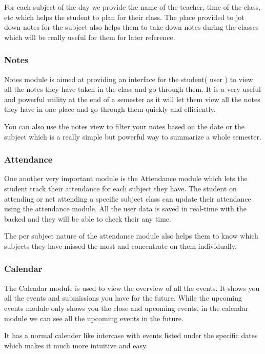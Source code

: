 \documentclass{article}
\begin{document}
For each subject of the day we provide the name of the teacher, time of the class, etc which helps the student to plan for their class.
The place provided to jot down notes for the subject also helps them to take down notes during the classes which will be really useful for them for later reference.

\subsubsection{Notes}
Notes module is aimed at providing an interface for the student( user ) to view all the notes they have taken in the class and go through them.
It is a very useful and powerful utility at the end of a semester as it will let them view all the notes they have in one place and go through them quickly and efficiently.

You can also use the notes view to filter your notes based on the date or the subject which is a really simple but powerful way to summarize a whole semester.

\subsubsection{Attendance}
One another very important module is the Attendance module which lets the student track their attendance for each subject they have. The student on attending or net attending a specific subject class can update their attendance using the attendance module. All the user data is saved in real-time with the backed and they will be able to check their any time.

The per subject nature of the attendance module also helps them to know which subjects they have missed the most and concentrate on them individually.

\subsubsection{Calendar}
The Calendar module is used to view the overview of all the events. It shows you all the events and submissions you have for the future. While the upcoming events module only shows you the close and upcoming events, in the calendar module we can see all the upcoming events in the future.

It has a normal calender like intercase with events listed under the specific dates which makes it much more intuitive and easy.

\vspace{1em}
\end{document}
